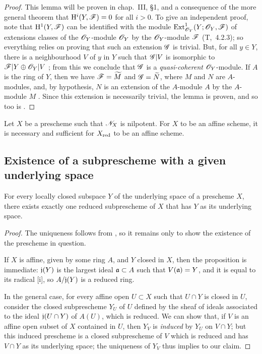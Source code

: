 \begin{proof}
\label{proof-1.5.1.9}
This lemma will be proven in chap.~III, §1, and a consequence of the more general theorem that $\mathrm{H}^i(Y,\mathscr{F})=0$ for all $i>0$.
To give an independent proof, note that $\mathrm{H}^1(Y,\mathscr{F})$ can be identified with the module ${\mathop{\mathrm{Ext}}\nolimits}_{\mathscr{O}_Y}^1(Y;\mathscr{O}_Y,\mathscr{F})$ of extensions classes of the $\mathscr{O}_Y$-module $\mathscr{O}_Y$ by the $\mathscr{O}_Y$-module $\mathscr{F}$ (T,~4.2.3);
so everything relies on proving that such an extension $\mathscr{G}$ is trivial.
But, for all $y\in Y$, there is a neighbourhood $V$ of $y$ in $Y$ such that $\mathscr{G}|V$ is isomorphic to $\mathscr{F}|Y\oplus\mathscr{O}_Y|V$ ;
from this we conclude that $\mathscr{G}$ is a \emph{quasi-coherent} $\mathscr{O}_Y$-module.
If $A$ is the ring of $Y$, then we have $\mathscr{F}={\widetilde{M}}$ and $\mathscr{G}={\widetilde{N}}$, where $M$ and $N$ are $A$-modules, and, by hypothesis, $N$ is an extension of the $A$-module $A$ by the $A$-module $M$ .
Since this extension is necessarily trivial, the lemma is proven, and so too is .
\end{proof}

\begin{cor}[5.1.10]
\label{1.5.1.10}
Let $X$ be a prescheme such that $\mathscr{N}_X$ is nilpotent.
For $X$ to be an affine scheme, it is necessary and sufficient for $X_{\mathrm{red}}$ to be an affine scheme.
\end{cor}

\subsection{Existence of a subprescheme with a given underlying space}
\label{subsection:existence-of-a-subprescheme-with-a-given-underlying-space}

\begin{prop}[5.2.1]
\label{1.5.2.1}
For every locally closed subspace $Y$ of the underlying space of a prescheme $X$, there exists exactly one reduced subprescheme of $X$ that has $Y$ as its underlying space.
\end{prop}

\begin{proof}
\label{proof-1.5.2.1}
The uniqueness follows from , so it remains only to show the existence of the prescheme in question.

If $X$ is affine, given by some ring $A$, and $Y$ closed in $X$, then the proposition is immediate:
$\mathfrak{j}(Y)$ is the largest ideal $\mathfrak{a}\subset A$ such that $V(\mathfrak{a})=Y$, and it is equal to its radical [i], so $A/\mathfrak{j}(Y)$ is a reduced ring.

In the general case, for every affine open $U\subset X$ such that $U\cap Y$ is closed in $U$, consider the closed subprescheme $Y_U$ of $U$ defined by the sheaf of ideals associated to the ideal $\mathfrak{j}(U\cap Y)$ of $A(U)$, which is reduced.
We can show that, if $V$ is an affine open subset of $X$ contained in $U$, then $Y_V$ is \emph{induced} by $Y_U$ on $V\cap Y$;
but this induced prescheme is a closed subprescheme of $V$ which is reduced and has $V\cap Y$ as its underlying space;
the uniqueness of $Y_V$ thus implies to our claim.
\end{proof}

